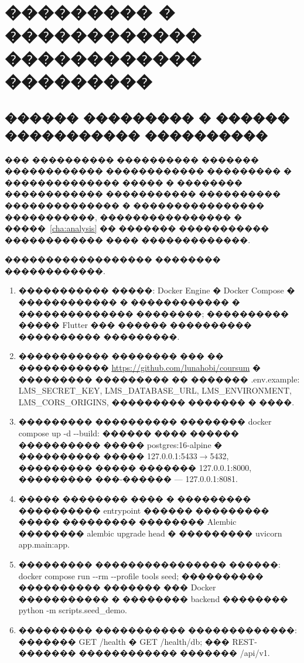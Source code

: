 \chapter{{\fontsize{14pt}{21pt}\selectfont\MakeUppercase{��������� � ������������ ������������ ���������}}}
\label{cha:impl}

\section{������ ��������� � ������ ����������� ����������}

��� ���������� ���������� ������� ������������ ������������ ��������� � �������������� ����� � �������� ������������ ����������� ���������� �������������� � ���������������� �����������, ���������������� � �����~\ref{cha:analysis} �� ������� ����������� ������������ ���� �������������\cite{metodichka_vkr_ikt_2021,gost1920178,gost3460190}.

������������������ �������� ������������.
\begin{enumerate}
  \item ����������� �����: Docker Engine � Docker Compose � ������������ � ������������ � �������������� ��������; ���������� ����� Flutter ��� ������ ���������� ���������� ���������.
  \item ����������� �������� ��� �� ����������� \url{https://github.com/lunahobi/coursum} � ��������� ��������� �� ������� .env.example: LMS\_SECRET\_KEY, LMS\_DATABASE\_URL, LMS\_ENVIRONMENT, LMS\_CORS\_ORIGINS, ��������� ������� � ����.
  \item ��������� ���������� �������� docker compose up -d {-}{-}build: ������ ���� ������ ���������� ����� postgres:16-alpine � ���������� ����� 127.0.0.1:5433\(\rightarrow\)5432, ��������� ����� ������� 127.0.0.1:8000, ��������� ���-������ --- 127.0.0.1:8081.
  \item ����� �������� ���� � ��������� ���������� entrypoint ������ ��������� ����� ��������� �������� Alembic �������� alembic upgrade head � ��������� uvicorn app.main:app.
  \item ��������� ���������������� ������: docker compose run {-}{-}rm {-}{-}profile tools seed; ���������� ���������� ������� ��� Docker ����������� � �������� backend �������� python -m scripts.seed\_demo.
  \item ��������� ����������� �������������: ������� GET /health � GET /health/db; ��� REST-������� ������������ ������� /api/v1.
\end{enumerate}

